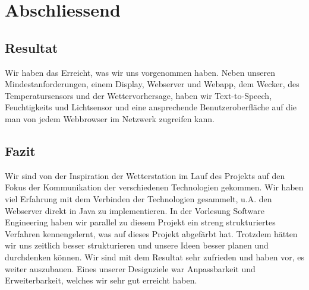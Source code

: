 \documentclass[11pt,a4paper]{article}
\begin{document}
\section{Abschliessend}
\subsection{Resultat}
Wir haben das Erreicht, was wir uns vorgenommen haben. Neben unseren Mindestanforderungen, einem Display, Webserver und Webapp, dem Wecker, des Temperatursensors und der Wettervorhersage, haben wir Text-to-Speech, Feuchtigkeits und Lichtsensor und eine ansprechende Benutzeroberfläche auf die man von jedem Webbrowser im Netzwerk zugreifen kann.

\subsection{Fazit}
Wir sind von der Inspiration der Wetterstation im Lauf des Projekts auf den Fokus der Kommunikation der verschiedenen Technologien gekommen. Wir haben viel Erfahrung mit dem Verbinden der Technologien gesammelt, u.A. den Webserver direkt in Java zu implementieren. In der Vorlesung Software Engineering haben wir parallel zu diesem Projekt ein streng strukturiertes Verfahren kennengelernt, was auf dieses Projekt abgefärbt hat. Trotzdem hätten wir uns zeitlich besser strukturieren und unsere Ideen besser planen und durchdenken können.
Wir sind mit dem Resultat sehr zufrieden und haben vor, es weiter auszubauen. Eines unserer Designziele war Anpassbarkeit und Erweiterbarkeit, welches wir sehr gut erreicht haben.



\end{document}
